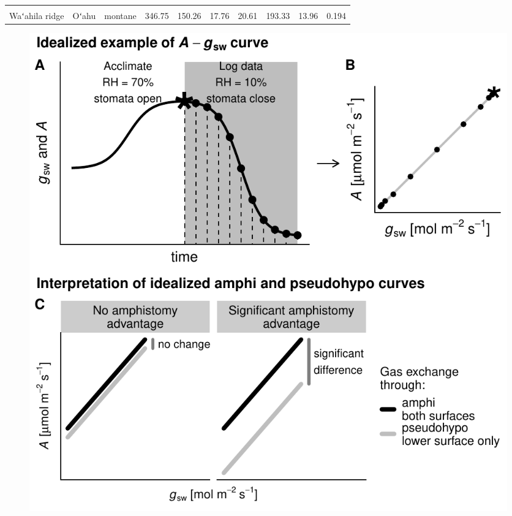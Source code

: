 \documentclass[
  letterpaper,
  DIV=11,
  numbers=noendperiod]{scrartcl}
\begin{document}
\begin{landscape}
\begin{longtable}{>{\raggedright\arraybackslash}p{4cm}>{\raggedright\arraybackslash}p{1.5cm}>{\raggedright\arraybackslash}p{1.5cm}rrrrrrr}
\addlinespace
\cellcolor{gray!6}{Mauʻumae Ridge} & \cellcolor{gray!6}{Oʻahu} & \cellcolor{gray!6}{montane} & \cellcolor{gray!6}{298.77} & \cellcolor{gray!6}{138.32} & \cellcolor{gray!6}{16.53} & \cellcolor{gray!6}{20.72} & \cellcolor{gray!6}{162.02} & \cellcolor{gray!6}{24.60} & \cellcolor{gray!6}{0.436}\\
Waʻahila ridge & Oʻahu & montane & 346.75 & 150.26 & 17.76 & 20.61 & 193.33 & 13.96 & 0.194\\
\bottomrule
\end{longtable}
\end{landscape}

\newpage

\begin{figure}
  \includegraphics{../figures/ags-curve.pdf}

\end{figure}
\end{document}
